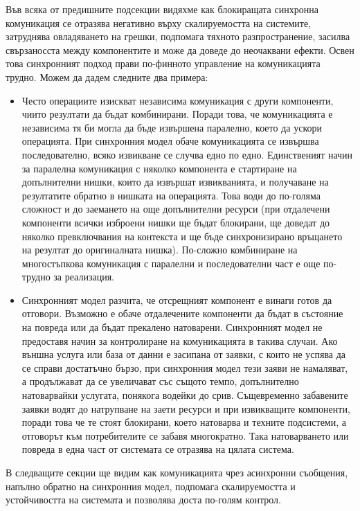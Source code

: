 Във всяка от предишните подсекции видяхме как блокиращата синхронна комуникация се отразява негативно върху скалируемостта на системите, затруднява овладяването на грешки, подпомага тяхното разпространение, засилва свързаносста между компонентите и може да доведе до неочаквани ефекти. Освен това синхронният подход прави по-финното управление на комуникацията трудно. Можем да дадем следните два примера:

\begin{itemize}
  \item Често операциите изискват независима комуникация с други компоненти, чиито резултати да бъдат комбинирани. Поради това, че комуникацията е независима тя би могла да бъде извършена паралелно, което да ускори операцията. При синхронния модел обаче комуникацията се извършва последователно, всяко извикване се случва едно по едно. Единственият начин за паралелна комуникация с няколко компонента е стартиране на допълнителни нишки, които да извършат извикванията, и получаване на резултатите обратно в нишката на операцията. Това води до по-голяма сложност и до заемането на още допълнителни ресурси (при отдалечени компоненти всички изброени нишки ще бъдат блокирани, ще доведат до няколко превключвания на контекста и ще бъде синхронизирано връщането на резултат до оригиналната нишка). По-сложно комбиниране на многостъпкова комуникация с паралелни и последователни част е още по-трудно за реализация.
  
  \item Синхронният модел разчита, че отсрещният компонент е винаги готов да отговори. Възможно е обаче отдалечените компоненти да бъдат в състояние на повреда или да бъдат прекалено натоварени. Синхронният модел не предоставя начин за контролиране на комуникацията в такива случаи. Ако външна услуга или база от данни е засипана от заявки, с които не успява да се справи достатъчно бързо, при синхронния модел тези заяви не намаляват, а продължават да се увеличават със същото темпо, допълнително натоварвайки услугата, понякога водейки до срив. Същевременно забавените заявки водят до натрупване на заети ресурси и при извикващите компоненти, поради това че те стоят блокирани, което натоварва и техните подсистеми, а отговорът към потребителите се забавя многократно. Така натоварването или повреда в една част от системата се отразява на цялата система.
\end{itemize}

В следващите секции ще видим как комуникацията чрез асинхронни съобщения, напълно обратно на синхронния модел, подпомага скалируемостта и устойчивостта на системата и позволява доста по-голям контрол.

